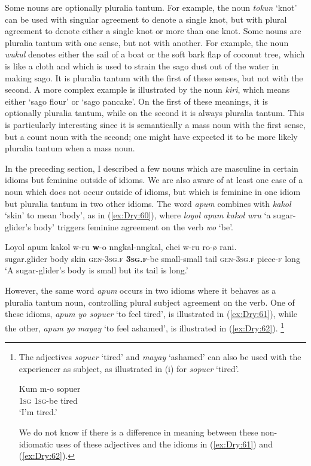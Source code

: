 \documentclass[output=collectionpaper]{langsci/langscibook}
\begin{document}
Some nouns are optionally pluralia tantum. For example, the noun \textit{tokun} `knot' can be used with singular agreement to denote a single knot, but with plural agreement to denote either a single knot or more than one knot. Some nouns are pluralia tantum with one sense, but not with another. For example, the noun \textit{wukul} denotes either the sail of a boat or the soft bark flap of coconut tree, which is like a cloth and which is used to strain the sago dust out of the water in making sago. It is pluralia tantum with the first of these senses, but not with the second. A more complex example is illustrated by the noun \textit{kiri}, which means either `sago flour' or `sago pancake'. On the first of these meanings, it is optionally pluralia tantum, while on the second it is always pluralia tantum. This is particularly interesting since it is semantically a mass noun with the first sense, but a count noun with the second; one might have expected it to be more likely pluralia tantum when a mass noun.

In the preceding section, I described a few nouns which are masculine in certain idioms but feminine outside of idioms. We are also aware of at least one case of a noun which does not occur outside of idioms, but which is feminine in one idiom but pluralia tantum in two other idioms. The word \textit{apum} combines with \textit{kakol} `skin' to mean `body', as in (\ref{ex:Dry:60}), where \textit{loyol apum kakol wru} `a sugar-glider's body' triggers feminine agreement on the verb \textit{wo} `be'.

\ea \label{ex:Dry:60}
\gll Loyol	apum	kakol	w-ru	\textbf{w}-o nngkal-nngkal,	chei	w-ru	ro-ø	rani.\\
sugar.glider body skin \textsc{gen}-\textsc{3sg.f} \textbf{\textsc{3sg.f}}-be small-small tail \textsc{gen}-\textsc{3sg.f} piece-\textsc{f} long\\
\glt `A sugar-glider's body is small but its tail is long.'
\z

However, the same word \textit{apum} occurs in two idioms where it behaves as a pluralia tantum noun, controlling plural subject agreement on the verb. One of these idioms, \textit{apum yo sopuer} `to feel tired', is illustrated in (\ref{ex:Dry:61}), while the other, \textit{apum yo mayay} `to feel ashamed', is illustrated in (\ref{ex:Dry:62}).%
\footnote{The adjectives \textit{sopuer} `tired' and \textit{mayay} `ashamed' can also be used with the experiencer as subject, as illustrated in (i) for \textit{sopuer} `tired'.

\begin{exe}
{
\gll Kum	m-o	sopuer\\
\textsc{1sg} \textsc{1sg}-be tired\\
\glt `I'm tired.'
}
\end{exe}

\noindent We do not know if there is a difference in meaning between these non-idiomatic uses of these adjectives and the idioms in (\ref{ex:Dry:61}) and (\ref{ex:Dry:62}).}
\end{document}
